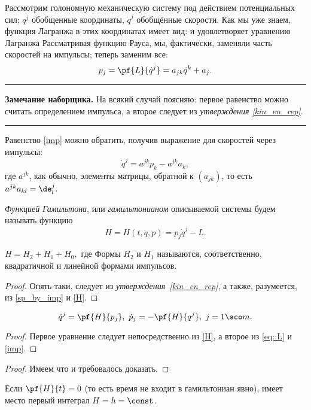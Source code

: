 \documentclass[a4paper,12pt]{article}
\newcommand{\tdf}[1]{\textsl{#1}}
\newcommand{\tstm}[1]{\emph{#1}}
\newenvironment{nbb}{\par\vskip3pt\hrule\vskip3pt\textbf{\footnotesize Замечание наборщика.}\footnotesize }
{\vskip3pt\hrule\par\vskip3pt}
\newcommand{\eql}[2]{\begin{equation}\label{#2}#1\end{equation}}
\begin{document}
Рассмотрим голономную механическую систему под действием потенциальных
сил; $q^j$ обобщенные координаты, $\dot{q}^j$ обобщённые скорости. Как
мы уже знаем, функция Лагранжа в этих координатах имеет вид:
и удовлетворяет уравнению Лагранжа
Рассматривая функцию Рауса, мы, фактически, заменяли часть скоростей
на импульсы; теперь заменим все:
\eql{p_j=\pf{L}{\dot{q}^j}=a_{jk}\dot{q}^k+a_j.}{imp}

\begin{nbb}
На всякий случай поясняю: первое равенство можно считать определением импульса, а второе
следует из \tdf{утверждения \ref{kin_en_rep}}.
\end{nbb}
Равенство \eqref{imp} можно обратить, получив выражение для скоростей через импульсы:
\eql{\dot{q}^j=a^{jk}p_k-a^{jk}a_k,}{sp_by_imp} где $a^{jk}$, как обычно, элементы матрицы,
обратной к $(a_{jk})$, то есть $a^{jk}a_{kl}=\de^j_l.$
\begin{df}
\tdf{Функцией Гамильтона}, или \tdf{гамильтонианом} описываемой системы будем называть функцию
\eql{H=H(t,q,p)=p_j\dot{q}^j-L.}{H}
\end{df}
\begin{stm}
$H=H_2+H_1+H_0,$ где 
Формы $H_2$ и $H_1$ называются, соответственно, квадратичной и линейной формами импульсов.
\end{stm}
\begin{proof}
Опять-таки, следует из \tstm{утверждения~\ref{kin_en_rep}}, а также, разумеется, из \eqref{sp_by_imp} и
\eqref{H}.
\end{proof}
\begin{theorem}
\eql{\dot{q}^j=\pf{H}{p_j},\ \dot{p}_j=-\pf{H}{q^j},\ j=1\sco
m.}{H_eq}
\end{theorem}
\begin{proof}
Первое уравнение следует непосредственно из \eqref{H}, а второе из \eqref{eq::L} и \eqref{imp}.
\end{proof}
\begin{imp}
\end{imp}
\begin{proof} Имеем
что и требовалось доказать.
\end{proof}
\begin{imp}
Если $\pf{H}{t}=0$ (то есть время не входит в гамильтониан явно),
имеет место первый интеграл $H=h=\const$.
\end{imp}
\end{document}
